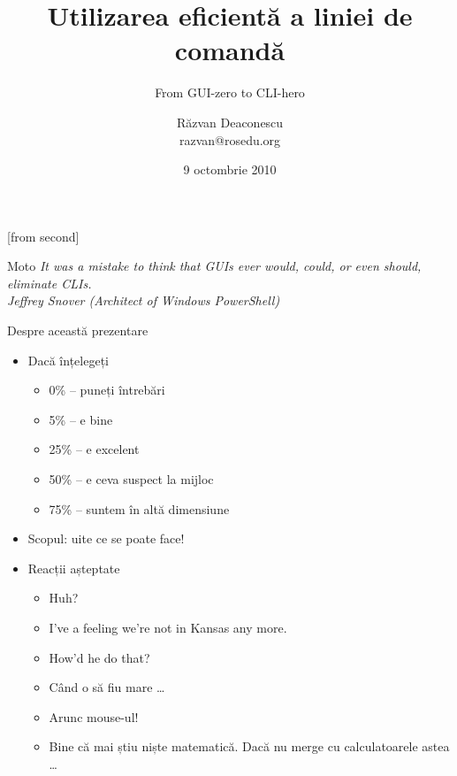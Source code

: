\documentclass{beamer}
\title[CLI Eficient]{Utilizarea eficientă a liniei de comandă}
\subtitle{From GUI-zero to CLI-hero}
\institute{ROSEdu Tech Talks}
\author[Răzvan Deaconescu]{Răzvan Deaconescu\\
	razvan@rosedu.org}
\date{9 octombrie 2010}
\begin{document}
[from second]



\frame{\titlepage}

\frame{\tableofcontents}

\begin{frame}{Moto}
	\textit{It was a mistake to think that GUIs ever would, could, or even
	   should, eliminate CLIs.}\\
	\vspace{5mm}
	\hfill \textit{Jeffrey Snover (Architect of Windows PowerShell)}
\end{frame}

\begin{frame}{Despre această prezentare}
	\begin{itemize}
		\item Dacă înțelegeți
			\begin{itemize}
				\item 0\% -- puneți întrebări
				\item 5\% -- e bine
				\item 25\% -- e excelent
				\item 50\% -- e ceva suspect la mijloc
				\item 75\% -- suntem în altă dimensiune
			\end{itemize}
		\item Scopul: uite ce se poate face!
		\item Reacții așteptate
			\begin{itemize}
				\item Huh?
				\item I've a feeling we're not in Kansas any more.
				\item How'd he do that?
				\item Când o să fiu mare \ldots
				\item Arunc mouse-ul!
				\item Bine că mai știu niște matematică. Dacă nu merge cu
				calculatoarele astea \ldots
			\end{itemize}
	\end{itemize}
\end{frame}
\end{document}
